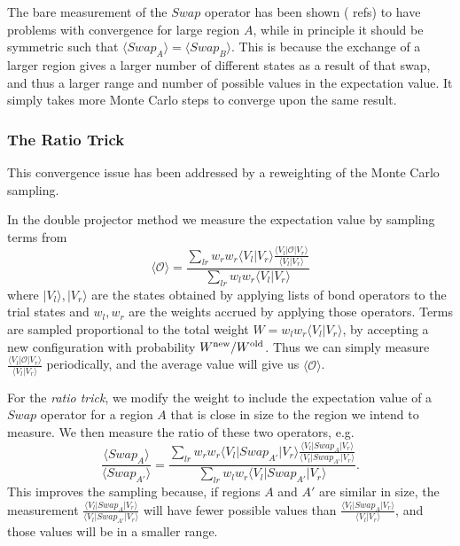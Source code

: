 \documentclass[prb,aps,twocolumn,floatfix,amsmath,amssymb,superscriptaddress,tightenlines]{revtex4}
\newcommand{\be}{\begin{equation}}
\newcommand{\ee}{\end{equation}}
\begin{document}
The bare measurement of the $Swap$ operator has been shown ({\color{red} refs}) to have problems with convergence for large region $A$, while in principle it should be symmetric such that $\langle Swap_A \rangle = \langle Swap_B \rangle$.
This is because the exchange of a larger region gives a larger number of different states as a result of that swap, and thus a larger range and number of possible values in the expectation value.
It simply takes more Monte Carlo steps to converge upon the same result.


\subsubsection{The Ratio Trick}
This convergence issue has been addressed by a reweighting of the Monte Carlo sampling.

In the double projector method we measure the expectation value by sampling terms from 
\be
\langle \mathcal{O} \rangle =\frac {\sum_{lr} w_r w_r\langle V_l  \lvert V_r\rangle\frac{  \langle V_l  \lvert \mathcal{O} \lvert V_r\rangle}{ \langle V_l  \lvert V_r\rangle}}
		{\sum_{lr} w_l w_r \langle V_l  \lvert V_r\rangle}
\ee
where $\lvert V_l \rangle, \lvert V_r \rangle$ are the states obtained by applying lists of bond operators to the trial states and $w_l , w_r $ are the weights accrued by applying those operators.
Terms are sampled proportional to the total weight $W = w_l w_r \langle V_l  \lvert V_r\rangle$, by accepting a new configuration with probability $W^{\rm new}/W^{\rm old}$.
Thus we can simply measure $\tfrac{  \langle V_l  \lvert \mathcal{O} \lvert V_r\rangle}{ \langle V_l  \lvert V_r\rangle}$ periodically, and the average value will give us $\langle \mathcal{O} \rangle$.

For the {\it ratio trick}, we modify the weight to include the expectation value of a $Swap$ operator for a region $A$ that is close in size to the region we intend to measure.  
We then measure the ratio of these two operators, e.g.
\be
\frac{\langle {Swap_{A}} \rangle}{\langle {Swap_{A'}} \rangle} =\frac {\sum_{lr} w_r w_r\langle V_l \lvert Swap_{A'} \lvert V_r\rangle\frac{  \langle V_l  \lvert Swap_A \lvert V_r\rangle}{ \langle V_l \lvert Swap_{A'} \lvert V_r\rangle}}
		{\sum_{lr} w_l w_r \langle V_l \lvert Swap_{A'} \lvert V_r\rangle}.
\ee
This improves the sampling because, if regions $A$ and $A'$ are similar in size, the measurement $\tfrac{  \langle V_l  \lvert Swap_A \lvert V_r\rangle}{ \langle V_l \lvert Swap_{A'} \lvert V_r\rangle}$ will have fewer possible values than $\tfrac{  \langle V_l  \lvert Swap_A \lvert V_r\rangle}{ \langle V_l \lvert V_r\rangle}$, and those values will be in a smaller range.
\end{document}
